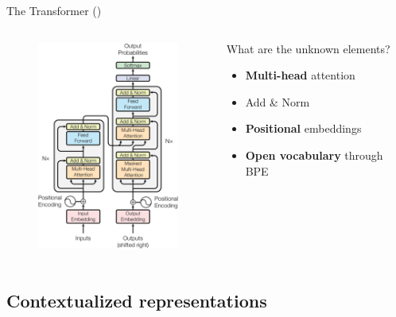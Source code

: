 \documentclass[12pt,aspectratio=169,handout]{beamer}
\begin{document}
\begin{frame}{The Transformer (\cite{Vaswani.et.al.2017})}
\begin{columns}[T] %

	\begin{column}{.48\textwidth}

	\begin{figure}[h]
		\includegraphics[height=7cm]{anno_transformer}
	\end{figure}
	\end{column}

	\begin{column}{.48\textwidth}
		What are the unknown elements?
		\pause
		\begin{itemize}
			\item \textbf{Multi-head} attention
			\item Add \& Norm
			\item \textbf{Positional} embeddings
			\pause
			\item \textbf{Open vocabulary} through BPE
		\end{itemize}	
	\end{column}

\end{columns}

\end{frame}

\subsection{Contextualized representations}
\end{document}
